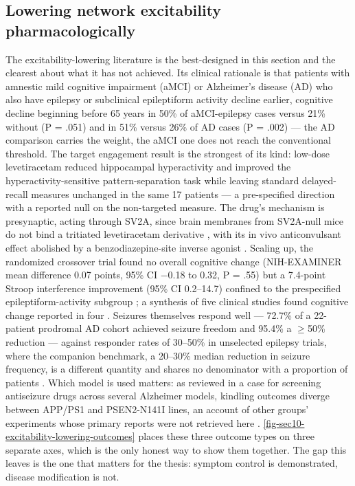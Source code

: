 \documentclass[11pt]{article}
\begin{document}
\subsection{Lowering network excitability pharmacologically}
\label{sec-10-excitability}

The excitability-lowering literature is the best-designed in this section and the clearest about what it has not achieved. Its clinical rationale is that patients with amnestic mild cognitive impairment (aMCI) or Alzheimer's disease (AD) who also have epilepsy or subclinical epileptiform activity decline earlier, cognitive decline beginning before 65 years in 50\% of aMCI-epilepsy cases versus 21\% without (P = .051) and in 51\% versus 26\% of AD cases (P = .002) \citep{Vossel2013} --- the AD comparison carries the weight, the aMCI one does not reach the conventional threshold. The target engagement result is the strongest of its kind: low-dose levetiracetam reduced hippocampal hyperactivity and improved the hyperactivity-sensitive pattern-separation task while leaving standard delayed-recall measures unchanged in the same 17 patients \citep{Bakker2012} --- a pre-specified direction with a reported null on the non-targeted measure. The drug's mechanism is presynaptic, acting through SV2A, since brain membranes from SV2A-null mice do not bind a tritiated levetiracetam derivative \citep{Lynch2004}, with its in vivo anticonvulsant effect abolished by a benzodiazepine-site inverse agonist \citep{Rigo2002}. Scaling up, the randomized crossover trial found no overall cognitive change (NIH-EXAMINER mean difference 0.07 points, 95\% CI $-$0.18 to 0.32, P = .55) but a 7.4-point Stroop interference improvement (95\% CI 0.2--14.7) confined to the prespecified epileptiform-activity subgroup \citep{Vossel2021}; a synthesis of five clinical studies found cognitive change reported in four \citep{Mohamadi2025}. Seizures themselves respond well --- 72.7\% of a 22-patient prodromal AD cohort achieved seizure freedom and 95.4\% a $\geq$50\% reduction \citep{Cretin2026} --- against responder rates of 30--50\% in unselected epilepsy trials, where the companion benchmark, a 20--30\% median reduction in seizure frequency, is a different quantity and shares no denominator with a proportion of patients \citep{Loscher2021}. Which model is used matters: as reviewed in a case for screening antiseizure drugs across several Alzheimer models, kindling outcomes diverge between APP/PS1 and PSEN2-N141I lines, an account of other groups' experiments whose primary reports were not retrieved here \citep{Barbour2025}. \ref{fig-sec10-excitability-lowering-outcomes} places these three outcome types on three separate axes, which is the only honest way to show them together. The gap this leaves is the one that matters for the thesis: symptom control is demonstrated, disease modification is not.
\end{document}
